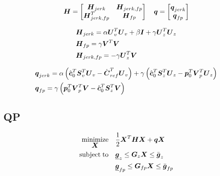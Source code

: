 \begin{equation*}
\M{H} = 
    \begin{bmatrix}
        \M{H}_{jerk}        &   \M{H}_{jerk,fp}\\
        \M{H}_{jerk,fp}^T   &   \M{H}_{fp}
    \end{bmatrix}
\quad
\V{q} = 
    \begin{bmatrix}
        \V{q}_{jerk}\\
        \V{q}_{fp}
    \end{bmatrix}
\end{equation*}

\begin{equation*}
\begin{split}
& \M{H}_{jerk} = 
    \alpha \M{U}_v^T \M{U}_v 
    + \beta \M{I}
    + \gamma \M{U}_z^T \M{U}_z\\
& \M{H}_{fp} = 
    \gamma \M{V}^T \M{V}\\
& \M{H}_{jerk,fp} = 
    - \gamma \M{U}_z^T \M{V}
\end{split}
\end{equation*}


\begin{equation*}
\begin{split}
& \V{q}_{jerk} = 
    \alpha 
    \left(
        \cstate_0^T \M{S}_v^T \M{U}_v
        -
        \cVel_{ref}^T \M{U}_v 
    \right)
    + 
    \gamma 
    \left(
        \cstate_0^T \M{S}_z^T \M{U}_z
        - 
        \fp_0^T \M{V}_p^T \M{U}_z 
    \right)\\
& \V{q}_{fp} =
    \gamma 
    \left(
        \fp_0^T \M{V}_p^T \M{V}
        - 
        \cstate_0^T \M{S}_z^T \M{V}
    \right)
\end{split}
\end{equation*}


\subsection{QP}
\begin{equation*}
\begin{split}
    \minimize{\V{X}}    & \frac{1}{2} \V{X}^T\M{H}\V{X} + \V{q} \V{X}\\
    \subjectto          & \underline{\V{g}}_z  \le  \M{G}_z \V{X}  \le  \bar{\V{g}}_z\\
                        & \underline{\V{g}}_{fp}  \le  \M{G}_{fp} \V{X}  \le  \bar{\V{g}}_{fp}
\end{split}
\end{equation*}
